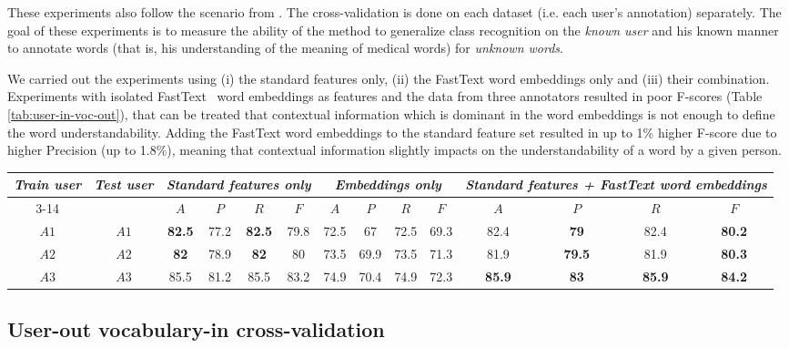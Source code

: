 These experiments also follow the scenario from \cite{Grabar-PITR2014}. The cross-validation is done on each dataset (i.e. each user's annotation) separately. The goal of these experiments is to measure the ability of the method to generalize class recognition on the \textit{known user} and his known manner to annotate words (that is, his understanding of the meaning of medical words) for \textit{unknown words}. 

We carried out the experiments using (i) the standard features only, (ii) the FastText word embeddings only and (iii) their combination. Experiments with isolated FastText ~word embeddings as features and the data from three annotators resulted in poor F-scores (Table \ref{tab:user-in-voc-out}), that can be treated that contextual information which is dominant in the word embeddings is not enough to define the word understandability. Adding the FastText word embeddings to the standard feature set resulted in up to 1\% higher F-score due to higher Precision (up to 1.8\%), meaning that contextual information slightly impacts on the understandability of a word by a given person.

\begin{table*}[h]
\begin{tabular}{cc|cccc|cccc|cccc}
\multirow{2}{0.6cm}{\textit{Train user}} & \multirow{2}{0.6cm}{\textit{Test user}} & \multicolumn{4}{c|}{\textit{Standard features only}} & \multicolumn{4}{c|}{\textit{Embeddings only}} & \multicolumn{4}{X}{\textit{Standard features + FastText word embeddings}} \\ \cline{3-14} 
 &  & $A$ & $P$ & $R$ & $F$ & $A$ & $P$ & $R$ & $F$ & $A$ & $P$ & $R$ & $F$ \\ \hline
$A1$ & $A1$ & \textbf{82.5} & 77.2 & \textbf{82.5} & 79.8 & 72.5 & 67 & 72.5 & 69.3 & 82.4 & \textbf{79} & 82.4 & \textbf{80.2} \\
$A2$ & $A2$ & \textbf{82} & 78.9 & \textbf{82} & 80 & 73.5 & 69.9 & 73.5 & 71.3 & 81.9 & \textbf{79.5} & 81.9 & \textbf{80.3} \\ 
$A3$ & $A3$ & 85.5 & 81.2 & 85.5 & 83.2 & 74.9 & 70.4 & 74.9 & 72.3 & \textbf{85.9} & \textbf{83} & \textbf{85.9} & \textbf{84.2} \\ \hline 
\end{tabular}
    \caption{Experiments on user-in vocabulary-out cross-validation}
    \label{tab:user-in-voc-out}
\end{table*}


\subsection{User-out vocabulary-in cross-validation}

